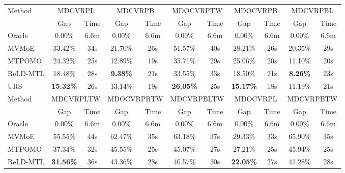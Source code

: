 \documentclass{article}
\theoremstyle{plain}
\theoremstyle{definition}
\theoremstyle{remark}
\begin{document}
\begin{table}[htbp]
{\begin{tabular}{l|cc|cc|cc|cc|cc}
    \midrule
    \midrule
    \multirow{2}[2]{*}{Method} & \multicolumn{2}{c|}{MDCVRPL} & \multicolumn{2}{c|}{MDCVRPB} & \multicolumn{2}{c|}{MDOCVRPTW} & \multicolumn{2}{c|}{MDOCVRPB} & \multicolumn{2}{c}{MDCVRPBL} \\
          & Gap   & Time  & Gap   & Time  & Gap   & Time  & Gap   & \multicolumn{1}{c|}{Time} & Gap   & \multicolumn{1}{c}{Time} \\
    \midrule
    Oracle & 0.00\% & 6.6m  & 0.00\% & 6.6m  & 0.00\% & 6.6m  & 0.00\% & \multicolumn{1}{c|}{6.6m} & 0.00\% & \multicolumn{1}{c}{6.6m} \\
    MVMoE & 33.42\% & 34s   & 21.70\% & 26s   & 51.57\% & 40s   & 28.21\% & \multicolumn{1}{c|}{26s} & 20.35\% & \multicolumn{1}{c}{29s} \\
    MTPOMO & 24.32\% & 25s   & 12.89\% & 19s   & 35.71\% & 29s   & 25.06\% & \multicolumn{1}{c|}{20s} & 11.10\% & \multicolumn{1}{c}{20s} \\
    ReLD-MTL & 18.48\% & 28s   & \cellcolor[HTML]{D0CECE}\textbf{9.38\%} & 21s   & 33.55\% & 33s   & 18.50\% & \multicolumn{1}{c|}{21s} & \cellcolor[HTML]{D0CECE}\textbf{8.26\%} & \multicolumn{1}{c}{23s} \\
    URS   & \cellcolor[HTML]{D0CECE}\textbf{15.32\%} & 26s   & 13.14\% & 19s   & \cellcolor[HTML]{D0CECE}\textbf{26.05\%} & 25s   & \cellcolor[HTML]{D0CECE}\textbf{15.17\%} & \multicolumn{1}{c|}{18s} & 11.19\% & \multicolumn{1}{c}{21s} \\
    \midrule
    \midrule
    \multirow{2}[2]{*}{Method} & \multicolumn{2}{c|}{MDCVRPLTW} & \multicolumn{2}{c|}{MDOCVRPBTW} & \multicolumn{2}{c|}{MDCVRPBLTW} & \multicolumn{2}{c|}{MDOCVRPL} & \multicolumn{2}{c}{MDCVRPBTW} \\
          & Gap   & Time  & Gap   & Time  & Gap   & Time  & Gap   & \multicolumn{1}{c|}{Time} & Gap   & \multicolumn{1}{c}{Time} \\
    \midrule
    Oracle & 0.00\% & 6.6m  & 0.00\% & 6.6m  & 0.00\% & 6.6m  & 0.00\% & \multicolumn{1}{c|}{6.6m} & 0.00\% & \multicolumn{1}{c}{6.6m} \\
    MVMoE & 55.55\% & 44s   & 62.47\% & 35s   & 63.18\% & 37s   & 29.33\% & \multicolumn{1}{c|}{33s} & 65.90\% & \multicolumn{1}{c}{35s} \\
    MTPOMO & 37.34\% & 32s   & 45.55\% & 25s   & 45.07\% & 27s   & 27.21\% & \multicolumn{1}{c|}{25s} & 45.94\% & \multicolumn{1}{c}{25s} \\
    ReLD-MTL & \cellcolor[HTML]{D0CECE}\textbf{31.56\%} & 36s   & 43.36\% & 28s   & 40.57\% & 30s   & \cellcolor[HTML]{D0CECE}\textbf{22.05\%} & \multicolumn{1}{c|}{27s} & 41.28\% & \multicolumn{1}{c}{28s} \\

\end{tabular}}
\end{table}
\end{document}
